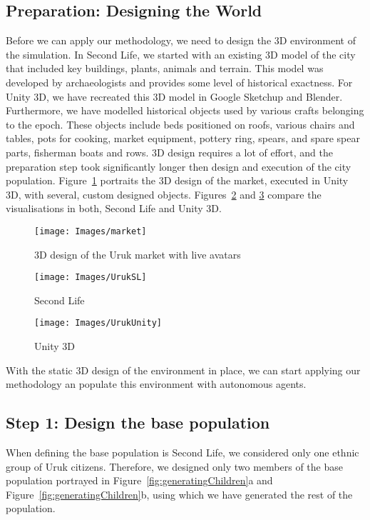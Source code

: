 \subsection{Preparation: Designing the World} 

Before we can apply our methodology, we need to design the 3D environment of the simulation. In Second Life, we started with an existing 3D model of the city that included key buildings, plants, animals and terrain. This model was developed by archaeologists and provides some level of historical exactness. For Unity 3D, we have recreated this 3D model in Google Sketchup and Blender. Furthermore, we have modelled historical objects used by various crafts belonging to the epoch. These 
objects include beds positioned on roofs, various chairs and tables, pots for cooking, market equipment, pottery ring, spears, and spare spear parts, fisherman boats and rows. 3D design requires a lot of effort, and the preparation step took significantly longer then design and execution of the city population. Figure~\ref{fig:market} portraits the 3D design of the market, executed in Unity 3D, with several, custom designed objects. Figures~\ref{fig:sl} and \ref{fig:unity} compare the visualisations in both, Second Life and Unity 3D. 

\begin{figure}[!ht]
    \centering
    \texttt{[image: Images/market]}
    \caption{3D design of the Uruk market with live avatars}
    \label{fig:market}
\end{figure}%


\begin{figure}[!ht]
	\texttt{[image: Images/UrukSL]} 
	\caption{Second Life}
	\label{fig:sl}
\end{figure}

\begin{figure}[!ht]
	\texttt{[image: Images/UrukUnity]}
	\caption{Unity 3D}
	\label{fig:unity}
\end{figure}


With the static 3D design of the environment in place, we can start applying our methodology an populate this environment with autonomous agents.  
 
\subsection{Step 1: Design the base population}

When defining the base population is Second Life, we considered only one ethnic group of Uruk citizens. Therefore, we designed only two members of the base population portrayed in Figure~\ref{fig:generatingChildren}a and Figure~\ref{fig:generatingChildren}b, using which we have generated the rest of the population. 


